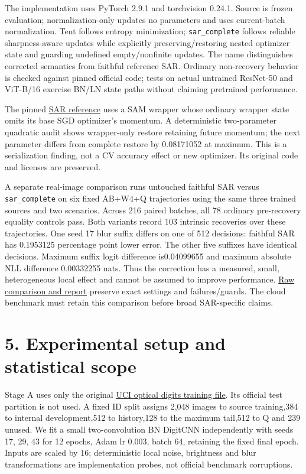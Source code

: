 \documentclass[11pt]{article}
\begin{document}
The implementation uses PyTorch 2.9.1 and torchvision 0.24.1. Source is frozen evaluation; normalization-only updates no parameters and uses current-batch normalization. Tent follows entropy minimization; \texttt{sar\_complete} follows reliable sharpness-aware updates while explicitly preserving/restoring nested optimizer state and guarding undefined empty/nonfinite updates. The name distinguishes corrected semantics from faithful reference SAR. Ordinary non-recovery behavior is checked against pinned official code; tests on actual untrained ResNet-50 and ViT-B/16 exercise BN/LN state paths without claiming pretrained performance.

The pinned \href{https://github.com/mr-eggplant/SAR/tree/20f6e24b17525f34503510afccedc0629b67b7c4}{SAR reference} uses a SAM wrapper whose ordinary wrapper state omits its base SGD optimizer's momentum. A deterministic two-parameter quadratic audit shows wrapper-only restore retaining future momentum; the next parameter differs from complete restore by 0.08171052 at maximum. This is a serialization finding, not a CV accuracy effect or new optimizer. Its original code and licenses are preserved.

A separate real-image comparison runs untouched faithful SAR versus \texttt{sar\_complete} on six fixed AB+W4+Q trajectories using the same three trained sources and two scenarios. Across 216 paired batches, all 78 ordinary pre-recovery equality controls pass. Both variants record 103 intrinsic recoveries over these trajectories. One seed 17 blur suffix differs on one of 512 decisions: faithful SAR has 0.1953125 percentage point lower error. The other five suffixes have identical decisions. Maximum suffix logit difference is0.04099655 and maximum absolute NLL difference 0.00332255 nats. Thus the correction has a measured, small, heterogeneous local effect and cannot be assumed to improve performance. \href{../research/sar\_recovery\_comparison.md}{Raw comparison and report} preserve exact settings and failures/guards. The cloud benchmark must retain this comparison before broad SAR-specific claims.

\section*{5. Experimental setup and statistical scope}

Stage A uses only the original \href{https://archive.ics.uci.edu/dataset/80/optical+recognition+of+handwritten+digits}{UCI optical digits training file}. Its official test partition is not used. A fixed ID split assigns 2,048 images to source training,384 to internal development,512 to history,128 to the maximum tail,512 to Q and 239 unused. We fit a small two-convolution BN DigitCNN independently with seeds 17, 29, 43 for 12 epochs, Adam lr 0.003, batch 64, retaining the fixed final epoch. Inputs are scaled by 16; deterministic local noise, brightness and blur transformations are implementation probes, not official benchmark corruptions.
\end{document}
